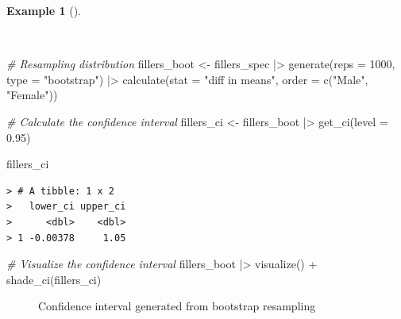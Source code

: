 \documentclass[
  letterpaper,
  DIV=11,
  numbers=noendperiod]{scrreprt}
\newenvironment{Shaded}{\begin{snugshade}}{\end{snugshade}}
\newcommand{\AttributeTok}[1]{\textcolor[rgb]{0.00,0.00,0.00}{#1}}
\newcommand{\CommentTok}[1]{\textcolor[rgb]{0.00,0.00,0.00}{\textit{#1}}}
\newcommand{\DecValTok}[1]{\textcolor[rgb]{0.00,0.00,0.00}{#1}}
\newcommand{\FloatTok}[1]{\textcolor[rgb]{0.00,0.00,0.00}{#1}}
\newcommand{\FunctionTok}[1]{\textcolor[rgb]{0.00,0.00,0.00}{#1}}
\newcommand{\NormalTok}[1]{\textcolor[rgb]{0.00,0.00,0.00}{#1}}
\newcommand{\OtherTok}[1]{\textcolor[rgb]{0.00,0.00,0.00}{#1}}
\newcommand{\SpecialCharTok}[1]{\textcolor[rgb]{0.00,0.00,0.00}{#1}}
\newcommand{\StringTok}[1]{\textcolor[rgb]{0.00,0.00,0.00}{#1}}
\theoremstyle{definition}
\newtheorem{example}{Example}[chapter]
\theoremstyle{remark}
\begin{document}
\begin{example}[]\protect\hypertarget{exm-ida-num-bi-sex-ci}{}\label{exm-ida-num-bi-sex-ci}

~

\begin{Shaded}
\begin{Highlighting}[]
\CommentTok{\# Resampling distribution}
\NormalTok{fillers\_boot }\OtherTok{\textless{}{-}}
\NormalTok{  fillers\_spec }\SpecialCharTok{|\textgreater{}}
  \FunctionTok{generate}\NormalTok{(}\AttributeTok{reps =} \DecValTok{1000}\NormalTok{, }\AttributeTok{type =} \StringTok{"bootstrap"}\NormalTok{) }\SpecialCharTok{|\textgreater{}}
  \FunctionTok{calculate}\NormalTok{(}\AttributeTok{stat =} \StringTok{"diff in means"}\NormalTok{, }\AttributeTok{order =} \FunctionTok{c}\NormalTok{(}\StringTok{"Male"}\NormalTok{, }\StringTok{"Female"}\NormalTok{))}

\CommentTok{\# Calculate the confidence interval}
\NormalTok{fillers\_ci }\OtherTok{\textless{}{-}}
\NormalTok{  fillers\_boot }\SpecialCharTok{|\textgreater{}}
  \FunctionTok{get\_ci}\NormalTok{(}\AttributeTok{level =} \FloatTok{0.95}\NormalTok{)}

\NormalTok{fillers\_ci}
\end{Highlighting}
\end{Shaded}

\begin{verbatim}
> # A tibble: 1 x 2
>   lower_ci upper_ci
>      <dbl>    <dbl>
> 1 -0.00378     1.05
\end{verbatim}

\begin{Shaded}
\begin{Highlighting}[]
\CommentTok{\# Visualize the confidence interval}
\NormalTok{fillers\_boot }\SpecialCharTok{|\textgreater{}}
  \FunctionTok{visualize}\NormalTok{() }\SpecialCharTok{+}
  \FunctionTok{shade\_ci}\NormalTok{(fillers\_ci)}
\end{Highlighting}
\end{Shaded}

\begin{figure}[H]


\caption{\label{fig-ida-num-bi-sex-ci}Confidence interval generated from
bootstrap resampling}

\end{figure}%

\end{example}
\end{document}
